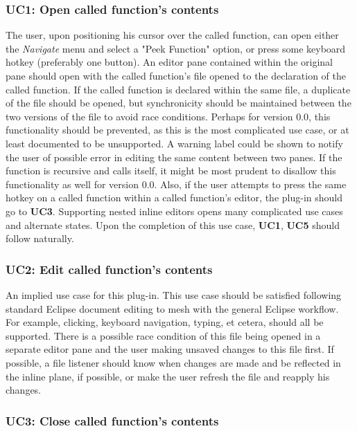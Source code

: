 \documentclass[]{report}
\begin{document}
		\subsubsection{UC1:  Open called function's contents}
		
			The user, upon positioning his cursor over the called function, can open either the \textit{Navigate} menu and select a "Peek Function" option, or press some keyboard hotkey (preferably one button).  An editor pane contained within the original pane should open with the called function's file opened to the declaration of the called function.  If the called function is declared within the same file, a duplicate of the file should be opened, but synchronicity should be maintained between the two versions of the file to avoid race conditions.  Perhaps for version 0.0, this functionality should be prevented, as this is the most complicated use case, or at least documented to be unsupported.  A warning label could be shown to notify the user of possible error in editing the same content between two panes. If the function is recursive and calls itself, it might be most prudent to disallow this functionality as well for version 0.0.  Also, if the user attempts to press the same hotkey on a called function within a called function's editor, the plug-in should go to \textbf{UC3}.  Supporting nested inline editors opens many complicated use cases and alternate states.  Upon the completion of this use case, \textbf{UC1}, \textbf{UC5} should follow naturally.
			
		\subsubsection{UC2:  Edit called function's contents}
		
			An implied use case for this plug-in.  This use case should be satisfied following standard Eclipse document editing to mesh with the general Eclipse workflow.  For example, clicking, keyboard navigation, typing, et cetera, should all be supported.  There is a possible race condition of this file being opened in a separate editor pane and the user making unsaved changes to this file first.  If possible, a file listener should know when changes are made and be reflected in the inline plane, if possible, or make the user refresh the file and reapply his changes.
		
		\subsubsection{UC3:  Close called function's contents}
		
\end{document}
